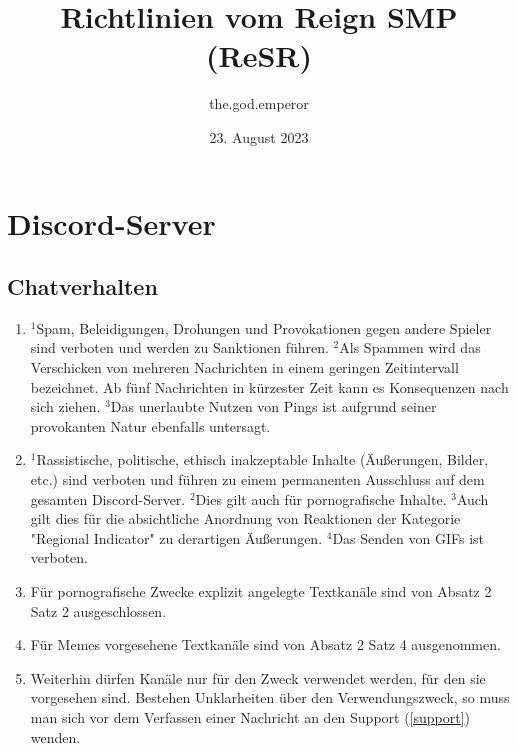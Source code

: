 \documentclass{article}
\title{Richtlinien vom Reign SMP (ReSR)}
\author{the.god.emperor}
\date{23. August 2023}
\begin{document}
\maketitle
\newpage
\tableofcontents
\newpage
\section{Discord-Server}
\subsection{Chatverhalten}\label{verhalten}
\begin{enumerate}[(1)]
	\item $^{1}$Spam, Beleidigungen, Drohungen und Provokationen gegen andere Spieler sind verboten und werden zu Sanktionen führen. $^{2}$Als Spammen wird das Verschicken von mehreren Nachrichten in einem geringen Zeitintervall bezeichnet. Ab fünf Nachrichten in kürzester Zeit kann es Konsequenzen nach sich ziehen. $^{3}$Das unerlaubte Nutzen von Pings ist aufgrund seiner provokanten Natur ebenfalls untersagt.
	\item $^{1}$Rassistische, politische, ethisch inakzeptable Inhalte (Äußerungen, Bilder, etc.) sind verboten und führen zu einem permanenten Ausschluss auf dem gesamten Discord-Server. $^{2}$Dies gilt auch für pornografische Inhalte. $^{3}$Auch gilt dies für die absichtliche Anordnung von Reaktionen der Kategorie "Regional Indicator" zu derartigen Äußerungen. $^{4}$Das Senden von GIFs ist verboten.
	\item Für pornografische Zwecke explizit angelegte Textkanäle sind von Absatz 2 Satz 2 ausgeschlossen.
	\item Für Memes vorgesehene Textkanäle sind von Absatz 2 Satz 4 ausgenommen.
	\item Weiterhin dürfen Kanäle nur für den Zweck verwendet werden, für den sie vorgesehen sind. Bestehen Unklarheiten über den Verwendungszweck, so muss man sich vor dem Verfassen einer Nachricht an den Support (\ref{support}) wenden.
\end{enumerate}
\end{document}

